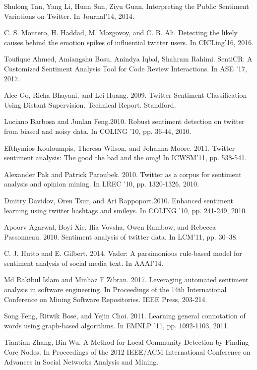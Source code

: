 \documentclass[runningheads]{llncs}
\begin{document}
\begin{thebibliography}{8}
Shulong Tan, Yang Li, Huan Sun, Ziyu Guan.
\newblock Interpreting the Public Sentiment Variations on Twitter. 
\newblock In Journal’14, 2014.

C. S. Montero, H. Haddad, M. Mozgovoy, and C. B. Ali.
\newblock Detecting the likely causes behind the emotion spikes of influential twitter users. 
\newblock In CICLing’16, 2016.

Toufique Ahmed, Amiangshu Bosu, Anindya Iqbal, Shahram Rahimi.
\newblock SentiCR: A Customized Sentiment Analysis Tool for Code Review Interactions.
\newblock In ASE ’17, 2017.

Alec Go, Richa Bhayani, and Lei Huang. 2009.
\newblock Twitter Sentiment Classification Using Distant Supervision.
\newblock Technical Report. Standford.

Luciano Barbosa and Junlan Feng.2010.
\newblock Robust sentiment detection on twitter from biased and noisy data.
\newblock In COLING ’10, pp. 36-44, 2010.

Efthymios Kouloumpis, Theresa Wilson, and Johanna Moore. 2011.
\newblock Twitter sentiment analysis: The good the bad and the omg!
\newblock In ICWSM’11, pp. 538-541.

Alexander Pak and Patrick Paroubek. 2010.
\newblock Twitter as a corpus for sentiment analysis and opinion mining.
\newblock In LREC ’10, pp. 1320-1326, 2010.

Dmitry Davidov, Oren Tsur, and Ari Rappoport.2010.
\newblock Enhanced sentiment learning using twitter hashtags and smileys.
\newblock In COLING ’10, pp. 241-249, 2010.

Apoorv Agarwal, Boyi Xie, Ilia Vovsha, Owen Rambow, and Rebecca Passonneau. 2010.
\newblock Sentiment analysis of twitter data.
\newblock In LCM’11, pp. 30–38.

C. J. Hutto and E. Gilbert. 2014.
\newblock Vader: A parsimonious rule-based model for sentiment analysis of social media text.
\newblock In AAAI’14.

Md Rakibul Islam and Minhaz F Zibran. 2017.
\newblock Leveraging automated sentiment analysis in software engineering. 
\newblock In Proceedings of the 14th International Conference on Mining Software Repositories. IEEE Press, 203-214.

Song Feng, Ritwik Bose, and Yejin Choi. 2011.
\newblock Learning general connotation of words using graph-based algorithms.
\newblock In EMNLP ’11, pp. 1092-1103, 2011.

Tiantian Zhang, Bin Wu.
\newblock A Method for Local Community Detection by Finding Core Nodes. 
\newblock In Proceedings of the 2012 IEEE/ACM International Conference on Advances in Social Networks Analysis and Mining.




\end{thebibliography}
\end{document}
